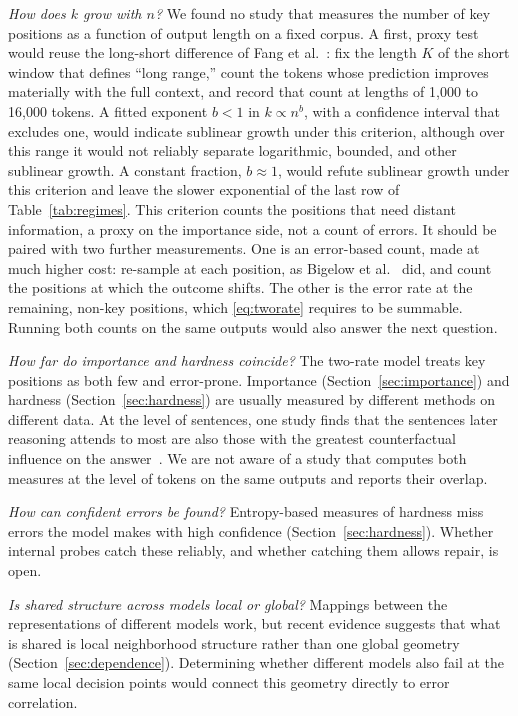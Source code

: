 \documentclass{ieeeaccess}
\begin{document}
\emph{How does $k$ grow with $n$?} We found no study that measures the number of key positions as a function of output length on a fixed corpus. A first, proxy test would reuse the long-short difference of Fang et al.~\cite{fang2024what}: fix the length $K$ of the short window that defines ``long range,'' count the tokens whose prediction improves materially with the full context, and record that count at lengths of 1{,}000 to 16{,}000 tokens. A fitted exponent $b < 1$ in $k \propto n^{b}$, with a confidence interval that excludes one, would indicate sublinear growth under this criterion, although over this range it would not reliably separate logarithmic, bounded, and other sublinear growth. A constant fraction, $b \approx 1$, would refute sublinear growth under this criterion and leave the slower exponential of the last row of Table~\ref{tab:regimes}. This criterion counts the positions that need distant information, a proxy on the importance side, not a count of errors. It should be paired with two further measurements. One is an error-based count, made at much higher cost: re-sample at each position, as Bigelow et al.~\cite{bigelow2025forking} did, and count the positions at which the outcome shifts. The other is the error rate at the remaining, non-key positions, which \eqref{eq:tworate} requires to be summable. Running both counts on the same outputs would also answer the next question.

\emph{How far do importance and hardness coincide?} The two-rate model treats key positions as both few and error-prone. Importance (Section~\ref{sec:importance}) and hardness (Section~\ref{sec:hardness}) are usually measured by different methods on different data. At the level of sentences, one study finds that the sentences later reasoning attends to most are also those with the greatest counterfactual influence on the answer~\cite{bogdan2025anchors}. We are not aware of a study that computes both measures at the level of tokens on the same outputs and reports their overlap.

\emph{How can confident errors be found?} Entropy-based measures of hardness miss errors the model makes with high confidence (Section~\ref{sec:hardness}). Whether internal probes catch these reliably, and whether catching them allows repair, is open.

\emph{Is shared structure across models local or global?} Mappings between the representations of different models work, but recent evidence suggests that what is shared is local neighborhood structure rather than one global geometry (Section~\ref{sec:dependence}). Determining whether different models also fail at the same local decision points would connect this geometry directly to error correlation.
\end{document}
